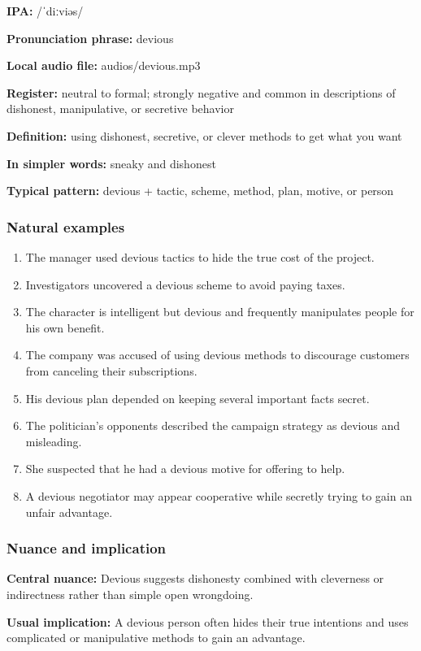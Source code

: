 \documentclass[11pt]{article}
\begin{document}
\textbf{IPA:} /ˈdiːviəs/

\textbf{Pronunciation phrase:} devious

\textbf{Local audio file:} audios/devious.mp3

\textbf{Register:} neutral to formal; strongly negative and common in descriptions of dishonest, manipulative, or secretive behavior

\textbf{Definition:} using dishonest, secretive, or clever methods to get what you want

\textbf{In simpler words:} sneaky and dishonest

\textbf{Typical pattern:} devious + tactic, scheme, method, plan, motive, or person

\subsubsection{Natural examples}
\begin{enumerate}
  \item The manager used devious tactics to hide the true cost of the project.
  \item Investigators uncovered a devious scheme to avoid paying taxes.
  \item The character is intelligent but devious and frequently manipulates people for his own benefit.
  \item The company was accused of using devious methods to discourage customers from canceling their subscriptions.
  \item His devious plan depended on keeping several important facts secret.
  \item The politician's opponents described the campaign strategy as devious and misleading.
  \item She suspected that he had a devious motive for offering to help.
  \item A devious negotiator may appear cooperative while secretly trying to gain an unfair advantage.
\end{enumerate}

\subsubsection{Nuance and implication}
\textbf{Central nuance:} Devious suggests dishonesty combined with cleverness or indirectness rather than simple open wrongdoing.

\textbf{Usual implication:} A devious person often hides their true intentions and uses complicated or manipulative methods to gain an advantage.
\end{document}
